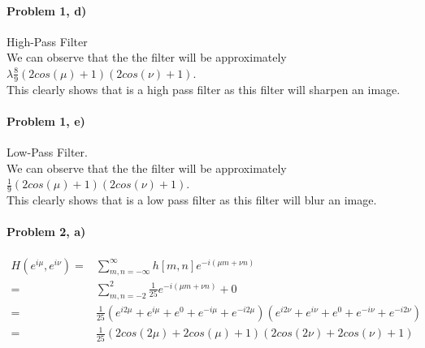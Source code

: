 \documentclass[11pt]{article}
\begin{document}
\paragraph{\noindent\textbf{\LARGE{Problem 1, d)}}}
\begin{flushleft}
    High-Pass Filter
    \\
    We can observe that the the filter will be approximately $\lambda \frac{8}{9} ( 2cos(\mu) + 1)(2 cos(\nu) + 1)$.
\\
 This clearly shows that is a high pass filter as this filter will sharpen an image. 

\end{flushleft} 

\paragraph{\noindent\textbf{\LARGE{Problem 1, e)}}}    
\begin{flushleft}
    Low-Pass Filter.
    \\
    We can observe that the the filter will be approximately $\frac{1}{9} ( 2cos(\mu) + 1)(2 cos(\nu) + 1)$.
\\
 This clearly shows that is a low pass filter as this filter will blur an image. 
\end{flushleft} 


\newpage
\paragraph{\noindent\textbf{\LARGE{Problem 2, a)}}}    
\begin{equation*}
\begin{split}
    H(e^{i\mu}, e^{i\nu}) = &\sum_{m,n = -\infty }^\infty h[m,n] e^{-i(\mu m + \nu n)} \\
                        = & \sum_{m,n = -2 }^2 \frac{1}{25} e^{-i(\mu m + \nu n)} + 0\\
                        = & \frac{1}{25} (e^{i2\mu} + e^{i\mu} + e^0 + e^{-i\mu} + e^{-i2\mu}) (e^{i2\nu} + e^{i\nu} + e^0 + e^{-i\nu} + e^{-i2\nu}) \\
                        = & \frac{1}{25} (2 cos(2 \mu) + 2 cos(\mu) + 1) (2 cos(2 \nu) + 2 cos(\nu) + 1)
\end{split}
\end{equation*}
\end{document}
